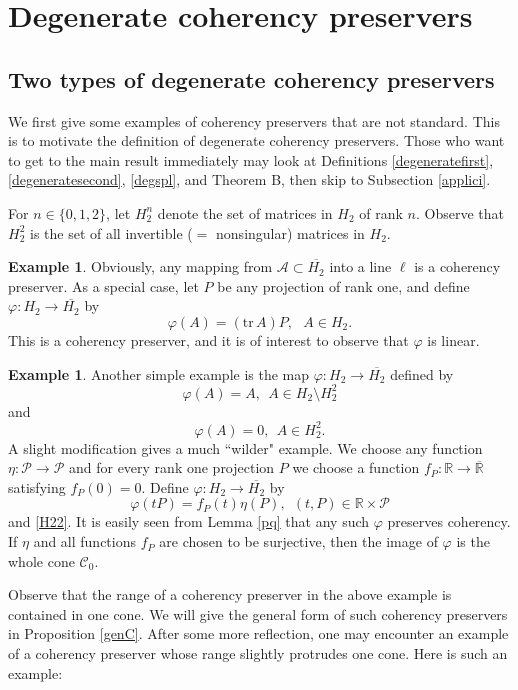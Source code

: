 \documentclass[10pt]{amsart}
\theoremstyle{definition}
\newtheorem{example}[theorem]{Example}
\theoremstyle{remark}
\numberwithin{subsection}{section}
\numberwithin{equation}{section}
\newcommand\cP{{\mathcal{P}}}
\newcommand\oH{{\overline{H_2}}}
\newcommand\oR{{\overline{\mathbb{R}}}}
\begin{document}


\section{Degenerate coherency preservers}\label{non}
\subsection{Two types of degenerate coherency preservers}
We first give some examples of coherency preservers that are not standard. 
This is to motivate the definition of degenerate coherency preservers.
Those who want to get to the main result immediately may look at Definitions \ref{degeneratefirst}, \ref{degeneratesecond}, \ref{degspl}, and Theorem B, then skip to Subsection \ref{applici}.

For $n\in \{0,1,2\}$, let $H_2^n$  denote the set of matrices in $H_2$ of rank $n$.
Observe that $H_2^2$ is the set of all invertible ($=$ nonsingular) matrices in $H_2$.

\begin{example}
Obviously, any mapping from $\mathcal{A}\subset \oH$ into a line $\ell$ is a coherency preserver. 
As a special case, let $P$ be any projection of rank one, and define $\varphi\colon H_2\to \oH$ by
\[
\varphi (A) = (\mathrm{tr}\, A) P, \ \ \ A \in H_2.
\]
This is a coherency preserver, and it is of interest to observe that $\varphi$ is linear. 
\end{example}

\begin{example}\label{exC}
Another simple example is the map $\varphi \colon H_2 \to \oH$ defined by
\[
\varphi (A) = A, \ \ A \in H_2\setminus H_2^2
\]
and 
\begin{equation}\label{H22}
\varphi (A) = 0,\ \ A \in H_2^2.
\end{equation}
A slight modification gives a much ``wilder" example. We  choose any function $\eta \colon \mathcal{P} \to \mathcal{P}$ and for every rank one projection $P$
we choose a function $f_P \colon \mathbb{R} \to {\oR}$ satisfying $f_P (0) = 0$. Define $\varphi\colon H_2\to \oH$ by
\[
\varphi (tP) = f_P (t) \eta (P),\ \ (t,P)\in \mathbb{R}\times \cP
\]
and \eqref{H22}.
It is easily seen from Lemma \ref{pq} that any such $\varphi$ preserves coherency. 
If $\eta$ and all functions $f_P$ are chosen to be surjective, then the image of $\varphi$ is the whole cone $\mathcal{C}_0$.
\end{example}
Observe that the range of a coherency preserver in the above example is contained in one cone. 
We will give the general form of such coherency preservers in Proposition \ref{genC}.
After some more reflection, one may encounter an example of a coherency preserver whose range slightly protrudes one cone. 
Here is such an example: 
\end{document}
